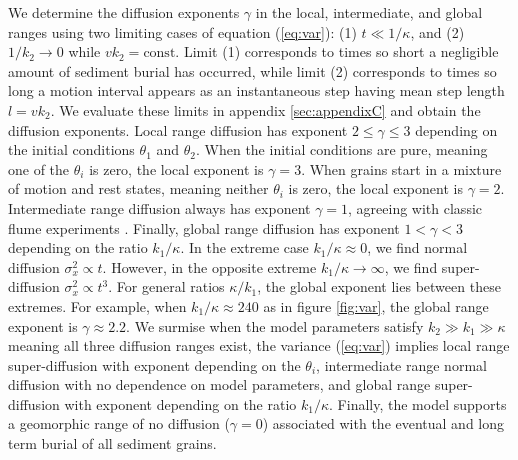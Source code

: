 \documentclass[draft,grl]{agujournal2018}
\begin{document}
We determine the diffusion exponents $\gamma$ in the local, intermediate, and global ranges using two limiting cases of equation (\ref{eq:var}): (1) $t\ll 1/\kappa$, and (2) $1/k_2 \rightarrow 0$ while $vk_2 = \text{const}$.
Limit (1) corresponds to times so short a negligible amount of sediment burial has occurred, while limit (2) corresponds to times so long a motion interval appears as an instantaneous step having mean step length $l=vk_2$.
We evaluate these limits in appendix \ref{sec:appendixC} and obtain the diffusion exponents.
Local range diffusion has exponent $2 \leq \gamma \leq 3$ depending on the initial conditions $\theta_1$ and $\theta_2$.
When the initial conditions are pure, meaning one of the $\theta_i$ is zero, the local exponent is $\gamma=3$.
When grains start in a mixture of motion and rest states, meaning neither $\theta_i$ is zero, the local exponent is $\gamma=2$.
Intermediate range diffusion always has exponent $\gamma=1$, agreeing with classic flume experiments \citep[e.g.,][]{Einstein1937,Yano1969a,Nakagawa1976}.
Finally, global range diffusion has exponent $1 < \gamma < 3$ depending on the ratio $k_1/\kappa$.
In the extreme case $k_1/\kappa \approx 0 $, we find normal diffusion $\sigma_x^2 \propto t$. 
However, in the opposite extreme $k_1/\kappa \rightarrow \infty$, we find  super-diffusion $\sigma_x^2 \propto t^3$.
For general ratios $\kappa/k_1$, the global exponent lies between these extremes.
For example, when $k_1/\kappa \approx 240$ as in figure \ref{fig:var}, the global range exponent is $\gamma \approx 2.2$. 
We surmise when the model parameters satisfy $k_2\gg k_1 \gg \kappa$ meaning all three diffusion ranges exist, the variance (\ref{eq:var}) implies local range super-diffusion with exponent depending on the $\theta_i$, intermediate range normal diffusion with no dependence on model parameters, and global range super-diffusion with exponent depending on the ratio $k_1/\kappa$.
Finally, the model supports a geomorphic range of no diffusion ($\gamma=0$) associated with the eventual and long term burial of all sediment grains.
\end{document}
